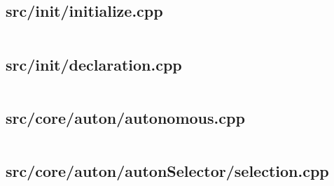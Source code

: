 \subsection{src/init/initialize.cpp}
\inputminted[linenos,tabsize=2,breaklines, breakanywhere]{c}{initialize.cpp}
\pagebreak

\subsection{src/init/declaration.cpp}
\inputminted[linenos,tabsize=2,breaklines, breakanywhere]{c}{declaration.cpp}
\pagebreak

\subsection{src/core/auton/autonomous.cpp}
\inputminted[linenos,tabsize=2,breaklines, breakanywhere]{c}{autonomous.cpp}
\pagebreak

\subsection{src/core/auton/autonSelector/selection.cpp}
\inputminted[linenos,tabsize=2,breaklines, breakanywhere]{c}{selection.cpp}
\pagebreak

